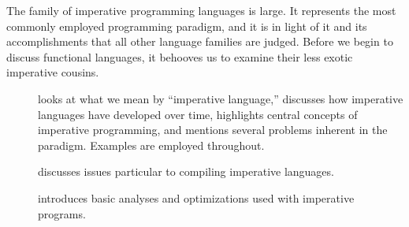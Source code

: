 \label{imperative:overview}
The family of imperative programming languages is large. It represents the most commonly employed programming paradigm, and it is in light of it and its accomplishments that all other language families are judged. Before we begin to discuss functional languages, it behooves us to examine their less exotic imperative cousins.
\begin{description}
\item[] looks at what we mean by ``imperative language,'' discusses how imperative languages have developed over time, highlights central concepts of imperative programming, and mentions several problems inherent in the paradigm. Examples are employed throughout.
\item[] discusses issues particular to compiling imperative languages.
\item[] introduces basic analyses and optimizations used with imperative programs.%
\end{description}